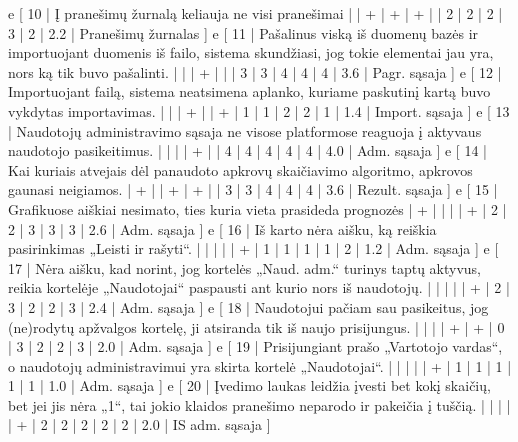 {  e [ 10  | Į pranešimų žurnalą keliauja ne visi pranešimai
                    |   | + | + | + |   | 2 | 2 | 2 | 3 | 2 | 2.2  | Pranešimų žurnalas ]
  e [ 11  | Pašalinus viską iš duomenų bazės ir importuojant duomenis iš failo,
  sistema skundžiasi, jog tokie elementai jau yra, nors ką tik buvo pašalinti.
                    |   |   | + |   |   | 3 | 3 | 4 | 4 | 4 | 3.6  | Pagr. sąsaja ]
  e [ 12  | Importuojant failą, sistema neatsimena aplanko, kuriame paskutinį
  kartą buvo vykdytas importavimas.
                    |   |   | + |   | + | 1 | 1 | 2 | 2 | 1 | 1.4  | Import. sąsaja ]
  e [ 13  | Naudotojų administravimo sąsaja ne visose platformose reaguoja į
  aktyvaus naudotojo pasikeitimus.
                    |   |   |   | + |   | 4 | 4 | 4 | 4 | 4 | 4.0  | Adm. sąsaja ]
  e [ 14  | Kai kuriais atvejais dėl panaudoto apkrovų skaičiavimo algoritmo,
  apkrovos gaunasi neigiamos.
                    | + |   | + | + |   | 3 | 3 | 4 | 4 | 4 | 3.6  | Rezult. sąsaja ]
  e [ 15 | Grafikuose aiškiai nesimato, ties kuria vieta prasideda prognozės
                    | + |   |   |   | + | 2 | 2 | 3 | 3 | 3 | 2.6  | Adm. sąsaja ]
  e [ 16 | Iš karto nėra aišku, ką reiškia pasirinkimas „Leisti ir rašyti“.
                    |   |   |   |   | + | 1 | 1 | 1 | 1 | 2 | 1.2  | Adm. sąsaja ]
  e [ 17 | Nėra aišku, kad norint, jog kortelės „Naud. adm.“ turinys taptų aktyvus,
  reikia kortelėje „Naudotojai“ paspausti ant kurio nors iš naudotojų.
                    |   |   |   |   | + | 2 | 3 | 2 | 2 | 3 | 2.4  | Adm. sąsaja ]
  e [ 18 | Naudotojui pačiam sau pasikeitus, jog (ne)rodytų apžvalgos kortelę, ji
  atsiranda tik iš naujo prisijungus.
                    |   |   |   | + | + | 0 | 3 | 2 | 2 | 3 | 2.0  | Adm. sąsaja ]
  e [ 19 | Prisijungiant prašo „Vartotojo vardas“, o naudotojų administravimui
  yra skirta kortelė „Naudotojai“.
                    |   |   |   |   | + | 1 | 1 | 1 | 1 | 1 | 1.0  | Adm. sąsaja ]
  e [ 20 | Įvedimo laukas leidžia įvesti bet kokį skaičių, bet jei jis nėra
  „1“, tai jokio klaidos pranešimo neparodo ir pakeičia į tuščią.
                    |   |   |   |   | + | 2 | 2 | 2 | 2 | 2 | 2.0  | IS adm. sąsaja ]
}
